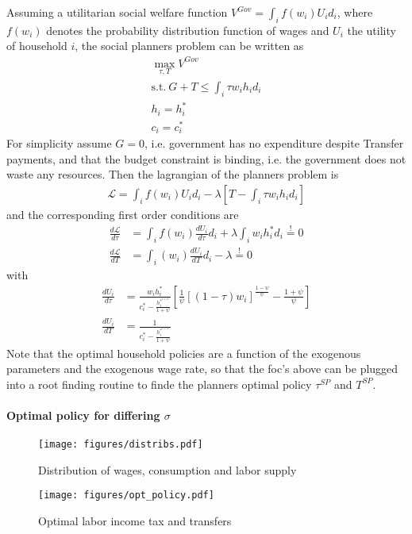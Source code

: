 Assuming a utilitarian social welfare function
$V^{Gov} = \int_i f\left(w_i\right) U_i d_i $, where $f\left(w_i\right) $
denotes the probability distribution function of wages and $U_i$ the utility of
household $i$, the social planners problem can be written as
\begin{align*}
  \max_{\tau, T} V^{Gov} \\
  \text{s.t.} ~ G + T \leq \int_i \tau w_i h_i d_i \\
  h_i = h_i^* \\
  c_i = c_i^*
\end{align*}
For simplicity assume $G = 0$, i.e. government has no expenditure despite
Transfer payments, and that the budget constraint is binding, i.e. the
government does not waste any resources. Then the lagrangian of the planners
problem is
\begin{align*}
  \mathscr{L} = \int_i f\left(w_i\right) U_i d_i - \lambda \left[ T - \int_i \tau w_i
  h_i d_i \right]
\end{align*}
and the corresponding first order conditions are
\begin{align*}
  \frac{d \mathscr{L}}{d \tau } &= \int_i f\left(w_i\right) \frac{d U_i}{d \tau}
  d_i + \lambda \int_i w_i h_i^* d_i \overset{!}{=} 0 \\
  \frac{d \mathscr{L}}{d T} &= \int_i \left(w_i\right) \frac{d U_i}{d T} d_i -
  \lambda \overset{!}{=} 0
\end{align*}
with
\begin{align*}
  \frac{d U_i}{d \tau} &= \frac{w_i h_i^*}{c_i^* - \frac{h_i^{*^{1 + \psi}}}{1 +
  \psi}} \left[ \frac{1}{\psi} \left[ \left(1 - \tau\right) w_i 
  \right]^{\frac{1 - \psi}{\psi}} - \frac{1 + \psi}{\psi} \right] \\
  \frac{d U_i}{d T} &= \frac{1}{c_i^* - \frac{h_i^{*^{1 + \psi}}}{1 +
  \psi}}
\end{align*}
Note that the optimal household policies are a function of the exogenous
parameters and the exogenous wage rate, so that the foc's above can be plugged
into a root finding routine to finde the planners optimal policy $\tau^{SP}$
and $T^{SP}$.

\paragraph{Optimal policy for differing $\sigma $}

\begin{figure}[h]
  \centering
  \texttt{[image: figures/distribs.pdf]}
  \caption{Distribution of wages, consumption and labor supply}
\end{figure}

\begin{figure}[h]
  \centering
  \texttt{[image: figures/opt\_policy.pdf]}
  \caption{Optimal labor income tax and transfers }
  \label{fig:opt-policy}
\end{figure}
